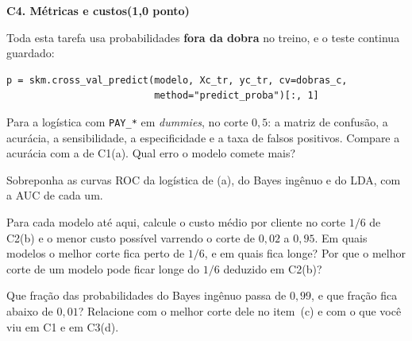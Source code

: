\documentclass[11pt,a4paper]{article}
\newcommand{\tarefa}[3]{%
  \bigskip\par\noindent
  {\large\bfseries\color{azulufrj}#1. #2}\hfill{\bfseries(#3)}\par
  \nopagebreak\vspace{0.3em}}
\newcommand{\cod}[1]{\texttt{#1}}
\begin{document}
\tarefa{C4}{Métricas e custos}{1,0 ponto}
Toda esta tarefa usa probabilidades \textbf{fora da dobra}
no treino, e o teste continua guardado:
\begin{lstlisting}
p = skm.cross_val_predict(modelo, Xc_tr, yc_tr, cv=dobras_c,
                          method="predict_proba")[:, 1]
\end{lstlisting}

\begin{itens}
  \item Para a logística com \cod{PAY\_*} em \emph{dummies}, no corte $0{,}5$: a matriz
        de confusão, a acurácia, a sensibilidade, a especificidade e a taxa de falsos
        positivos. Compare a acurácia com a de C1(a). Qual erro o modelo comete mais?
  \item Sobreponha as curvas ROC da logística de (a), do Bayes ingênuo e do LDA, com
        a AUC de cada um.
  \item Para cada modelo até aqui, calcule o custo médio por cliente no corte
        $1/6$ de C2(b) e o menor custo possível varrendo o corte de $0{,}02$ a
        $0{,}95$. Em quais modelos o melhor corte fica perto de $1/6$, e em quais fica
        longe? Por que o melhor corte de um modelo pode ficar longe do $1/6$ deduzido
        em C2(b)?
  \item Que fração das probabilidades do Bayes ingênuo passa de $0{,}99$, e que fração
        fica abaixo de $0{,}01$? Relacione com o melhor corte dele no item~(c) e com
        o que você viu em C1 e em C3(d).
\end{itens}
\end{document}
